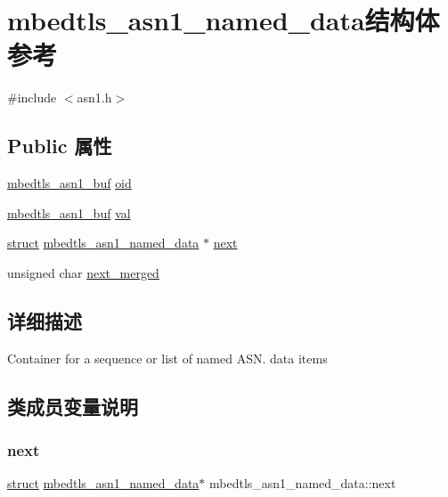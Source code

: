 \hypertarget{structmbedtls__asn1__named__data}{}\section{mbedtls\+\_\+asn1\+\_\+named\+\_\+data结构体 参考}
\label{structmbedtls__asn1__named__data}


{\ttfamily \#include $<$asn1.\+h$>$}

\subsection*{Public 属性}
\begin{DoxyCompactItemize}
\item 
\hyperlink{structmbedtls__asn1__buf}{mbedtls\+\_\+asn1\+\_\+buf} \hyperlink{structmbedtls__asn1__named__data_a0981fcdac0ce14b6922a953adf0624d9}{oid}
\item 
\hyperlink{structmbedtls__asn1__buf}{mbedtls\+\_\+asn1\+\_\+buf} \hyperlink{structmbedtls__asn1__named__data_ad99636f90fae31a96c26df85a7896b07}{val}
\item 
\hyperlink{interfacestruct}{struct} \hyperlink{structmbedtls__asn1__named__data}{mbedtls\+\_\+asn1\+\_\+named\+\_\+data} $\ast$ \hyperlink{structmbedtls__asn1__named__data_a38f29c37c55319b3c0a9c998c3e5bd0d}{next}
\item 
unsigned char \hyperlink{structmbedtls__asn1__named__data_aee15b65458fa2c10596ff7c210ba4ee1}{next\+\_\+merged}
\end{DoxyCompactItemize}


\subsection{详细描述}
Container for a sequence or list of \textquotesingle{}named\textquotesingle{} A\+S\+N. data items 

\subsection{类成员变量说明}
\mbox{\label{structmbedtls__asn1__named__data_a38f29c37c55319b3c0a9c998c3e5bd0d}} 
\subsubsection{\texorpdfstring{next}{next}}
{\footnotesize\ttfamily \hyperlink{interfacestruct}{struct} \hyperlink{structmbedtls__asn1__named__data}{mbedtls\+\_\+asn1\+\_\+named\+\_\+data}$\ast$ mbedtls\+\_\+asn1\+\_\+named\+\_\+data\+::next}

